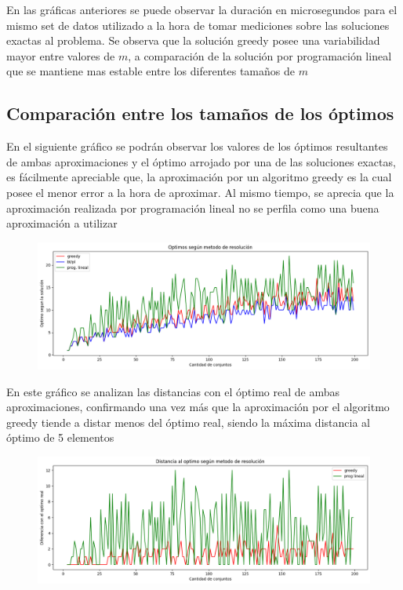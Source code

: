 En las gráficas anteriores se puede observar la duración en microsegundos para el mismo set de datos utilizado a la hora de tomar mediciones sobre las soluciones exactas al problema. Se observa que la solución greedy posee una variabilidad mayor entre valores de $m$, a comparación de la solución por programación lineal que se mantiene mas estable entre los diferentes tamaños de $m$

\subsection{Comparación entre los tamaños de los óptimos}

En el siguiente gráfico se podrán observar los valores de los óptimos resultantes de ambas aproximaciones y el óptimo arrojado por una de las soluciones exactas, es fácilmente apreciable que, la aproximación por un algoritmo greedy es la cual posee el menor error a la hora de aproximar. Al mismo tiempo, se aprecia que la aproximación realizada por programación lineal no se perfila como una buena aproximación a utilizar 

\begin{figure}[H]
    \centering
    \includegraphics[width=1\textwidth]{graficos/optimos.png}
\end{figure}

En este gráfico se analizan las distancias con el óptimo real de ambas aproximaciones, confirmando una vez más que la aproximación por el algoritmo greedy tiende a distar menos del óptimo real, siendo la máxima distancia al óptimo de 5 elementos 

\begin{figure}[H]
    \centering
    \includegraphics[width=1\textwidth]{graficos/distanciaaloptimo.png}
\end{figure}

